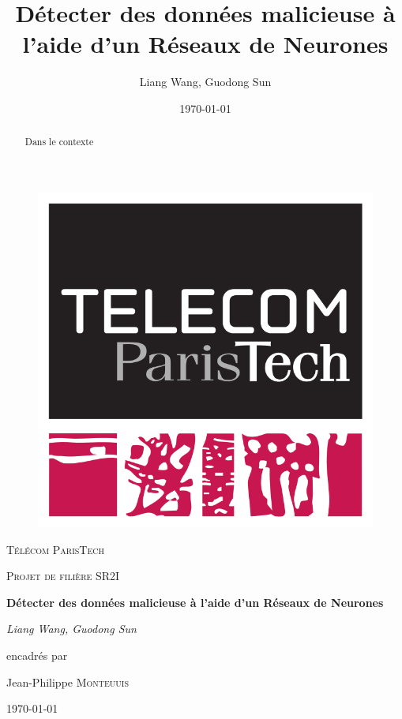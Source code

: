 \documentclass[a4paper]{report}
\title{Détecter des données malicieuse à l'aide d'un Réseaux de Neurones }
\author{Liang Wang, Guodong Sun}
\date{\today}
\begin{document}
\begin{titlepage}
	\centering
	\vspace{1cm}
\begin{figure}
	\centering
	\includegraphics[scale=0.2]{img/logo_TPT.png}
\end{figure}
	\vspace{1cm}
	{\scshape\LARGE Télécom ParisTech \par}
	\vspace{1cm}
	{\scshape\Large Projet de filière SR2I \par}
	\vspace{1.5cm}
	{\huge\bfseries Détecter des données malicieuse à l'aide d'un Réseaux de Neurones\par}
	\vspace{2cm}
	{\Large\itshape Liang Wang, Guodong Sun \par}
	\vfill
	encadrés par\par
	Jean-Philippe \textsc{Monteuuis}
	\vfill

	{\large \today\par}
\end{titlepage}
	
\begin{abstract}
	Dans le contexte 
\end{abstract}
\end{document}
